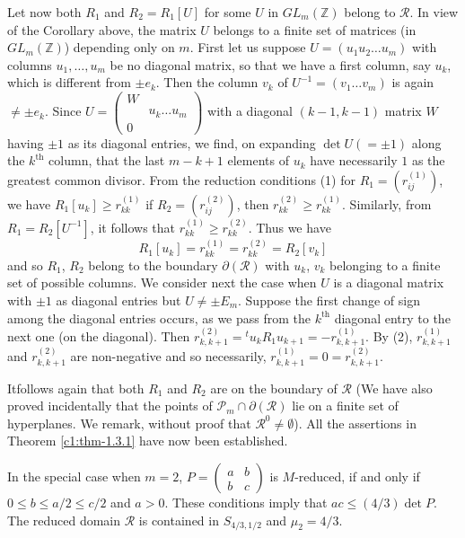 Let now both $R_{1}$ and $R_{2}=R_{1}[U]$ for some $U$ in
$GL_{m}(\mathbb{Z})$ belong to $\mathscr{R}$. In view of the Corollary
above, the matrix $U$ belongs to a finite set of matrices (in
$GL_{m}(\mathbb{Z})$) depending only on $m$. First let us suppose
$U=(u_{1}u_{2}\ldots u_{m})$ with columns $u_{1},\ldots,u_{m}$ be no
diagonal matrix, so that we have a first column, say $u_{k}$, which is
different from $\pm e_{k}$. Then the column $v_{k}$ of
$U^{-1}=(v_{1}\ldots v_{m})$ is again $\neq \pm e_{k}$. Since
$U=\left(\begin{smallmatrix} W & \\ & u_{k}\ldots u_{m}\\ 0 & 
\end{smallmatrix}\right)$ with a diagonal $(k-1,k-1)$ matrix $W$
having $\pm 1$ as its diagonal entries, we find, on expanding $\det
U(=\pm 1)$ along the $k^{\text{th}}$ column, that the last $m-k+1$
elements of $u_{k}$ have necessarily $1$ as the greatest common
divisor. From the reduction conditions (1) for
$R_{1}=\left(r^{(1)}_{ij}\right)$, we have $R_{1}[u_{k}]\geq
r^{(1)}_{kk}$ \ie if $R_{2}=\left(r^{(2)}_{ij}\right)$, then
$r^{(2)}_{kk}\geq r^{(1)}_{kk}$. Similarly, from
$R_{1}=R_{2}[U^{-1}]$, it follows that $r^{(1)}_{kk}\geq
r^{(2)}_{kk}$. Thus we have
$$
R_{1}[u_{k}]=r^{(1)}_{kk}=r^{(2)}_{kk}=R_{2}[v_{k}]
$$
and so $R_{1}$, $R_{2}$ belong to the boundary $\partial
(\mathscr{R})$ with $u_{k}$, $v_{k}$ belonging to a finite set of
possible columns. We consider next the case when $U$ is a diagonal
matrix with $\pm 1$ as diagonal entries but $U\neq \pm E_{m}$. Suppose
the first change of sign among the diagonal entries occurs, as we pass
from the $k^{\text{th}}$ diagonal entry to the next one (on the
diagonal). Then
$r^{(2)}_{k,k+1}={}^{t}u_{k}R_{1}u_{k+1}=-r^{(1)}_{k,k+1}$. By (2),
$r^{(1)}_{k,k+1}$ and $r^{(2)}_{k,k+1}$ are non-negative and so
necessarily, $r^{(1)}_{k,k+1}=0=r^{(2)}_{k,k+1}$.

It\pageoriginale follows again that both $R_{1}$ and $R_{2}$ are on
the boundary of $\mathscr{R}$ (We have also proved incidentally that
the points of $\mathscr{P}_{m}\cap \partial (\mathscr{R})$ lie on a
finite set of hyperplanes. We remark, without proof that
$\mathscr{R}^{0}\neq \emptyset$). All the assertions in Theorem
\ref{c1:thm-1.3.1} have now been established.

\begin{example*}
In the special case when $m=2$, $P=\left(\begin{smallmatrix} a & b\\ b
  & c\end{smallmatrix}\right)$ is $M$-reduced, if and only if $0\leq
  b\leq a/2\leq c/2$ and $a>0$. These conditions imply that $ac\leq
  (4/3)\det P$. The reduced domain $\mathscr{R}$ is contained in
  $S_{4/3,1/2}$ and $\mu_{2}=4/3$.
\end{example*}

